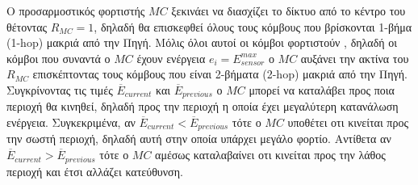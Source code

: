 Ο προσαρμοστικός φορτιστής $MC$ ξεκινάει να διασχίζει το δίκτυο από το κέντρο του θέτοντας $R_{MC}=1$, δηλαδή θα επισκεφθεί όλους τους κόμβους που βρίσκονται 1-βήμα
(1-hop) μακριά από την Πηγή. Μόλις όλοι αυτοί οι κόμβοι φορτιστούν , δηλαδή οι κόμβοι που συναντά ο $MC$ έχουν ενέργεια $e_{i} = E^{max}_{sensor}$ ο $MC$ αυξάνει την
ακτίνα του $R_{MC}$ επισκέπτοντας τους κόμβους που είναι 2-βήματα (2-hop) μακριά από την Πηγή. Συγκρίνοντας τις τιμές $\overline{E}_{current}$ και
$\overline{E}_{previous}$ ο $MC$ μπορεί να καταλάβει προς ποια περιοχή θα κινηθεί, δηλαδή προς την περιοχή η οποία έχει μεγαλύτερη κατανάλωση ενέργεια. Συγκεκριμένα,
αν $\overline{E}_{current} < \overline{E}_{previous}$ τότε ο $MC$ υποθέτει οτι κινείται προς την σωστή περιοχή, δηλαδή αυτή στην οποία υπάρχει μεγάλο φορτίο.
Αντίθετα αν $\overline{E}_{current} > \overline{E}_{previous}$ τότε ο $MC$ αμέσως καταλαβαίνει οτι κινείται προς την λάθος περιοχή και έτσι αλλάζει κατεύθυνση.

